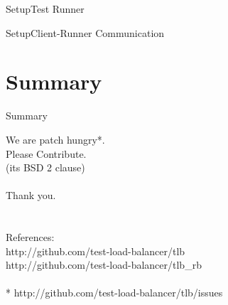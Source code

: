 \documentclass{beamer}
\begin{document}
\begin{frame}{Setup}{Test Runner}
  \begin{centering}
  \end{centering}
\end{frame}

\begin{frame}{Setup}{Client-Runner Communication}
  \begin{centering}
  \end{centering}
\end{frame}

\section*{Summary}

\begin{frame}{Summary}{}
  \begin{centering}
  {\huge We are patch hungry*.\\Please Contribute.\\}
  (its BSD 2 clause)\\
  \quad\\
  {\huge Thank you.}\\
  \quad\\
  \quad\\
  References:\\
  http://github.com/test-load-balancer/tlb\\
  http://github.com/test-load-balancer/tlb\_rb\\
  \quad\\
  * http://github.com/test-load-balancer/tlb/issues\\
  \end{centering}
\end{frame}




    
\end{document}
